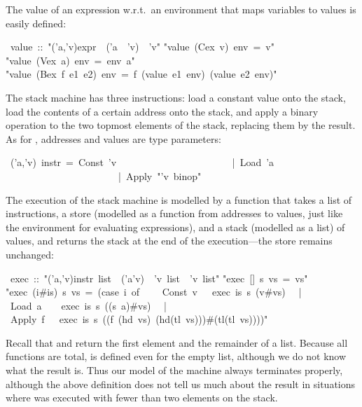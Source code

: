 \begin{isabelle}
\begin{isamarkuptext}
The value of an expression w.r.t.\ an environment that maps variables to
values is easily defined:%
\end{isamarkuptext}%
\ value\ ::\ {"}('a,'v)expr\ {\isasymRightarrow}\ ('a\ {\isasymRightarrow}\ 'v)\ {\isasymRightarrow}\ 'v{"}\isanewline
{}\isanewline
{"}value\ (Cex\ v)\ env\ =\ v{"}\isanewline
{"}value\ (Vex\ a)\ env\ =\ env\ a{"}\isanewline
{"}value\ (Bex\ f\ e1\ e2)\ env\ =\ f\ (value\ e1\ env)\ (value\ e2\ env){"}%
\begin{isamarkuptext}%
The stack machine has three instructions: load a constant value onto the
stack, load the contents of a certain address onto the stack, and apply a
binary operation to the two topmost elements of the stack, replacing them by
the result. As for , addresses and values are type parameters:%
\end{isamarkuptext}%
\ ('a,'v)\ instr\ =\ Const\ 'v\isanewline
\ \ \ \ \ \ \ \ \ \ \ \ \ \ \ \ \ \ \ \ \ \ \ |\ Load\ 'a\isanewline
\ \ \ \ \ \ \ \ \ \ \ \ \ \ \ \ \ \ \ \ \ \ \ |\ Apply\ {"}'v\ binop{"}%
\begin{isamarkuptext}%
The execution of the stack machine is modelled by a function
 that takes a list of instructions, a store (modelled as a
function from addresses to values, just like the environment for
evaluating expressions), and a stack (modelled as a list) of values,
and returns the stack at the end of the execution---the store remains
unchanged:%
\end{isamarkuptext}%
\ exec\ ::\ {"}('a,'v)instr\ list\ {\isasymRightarrow}\ ('a{\isasymRightarrow}'v)\ {\isasymRightarrow}\ 'v\ list\ {\isasymRightarrow}\ 'v\ list{"}\isanewline
{}\isanewline
{"}exec\ []\ s\ vs\ =\ vs{"}\isanewline
{"}exec\ (i\#is)\ s\ vs\ =\ (case\ i\ of\isanewline
\ \ \ \ Const\ v\ \ {\isasymRightarrow}\ exec\ is\ s\ (v\#vs)\isanewline
\ \ |\ Load\ a\ \ \ {\isasymRightarrow}\ exec\ is\ s\ ((s\ a)\#vs)\isanewline
\ \ |\ Apply\ f\ \ {\isasymRightarrow}\ exec\ is\ s\ ((f\ (hd\ vs)\ (hd(tl\ vs)))\#(tl(tl\ vs)))){"}%
\begin{isamarkuptext}%
\noindent
Recall that  and 
return the first element and the remainder of a list.
Because all functions are total,  is defined even for the empty
list, although we do not know what the result is. Thus our model of the
machine always terminates properly, although the above definition does not
tell us much about the result in situations where  was executed
with fewer than two elements on the stack.


\end{isamarkuptext}
\end{isabelle}
